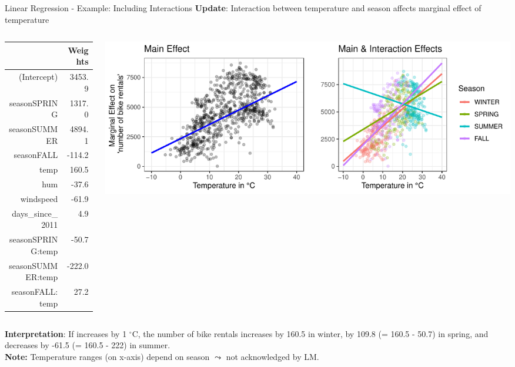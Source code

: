 \documentclass[11pt,compress,t,notes=noshow, aspectratio=169, xcolor=table]{beamer}
\begin{document}
\begin{frame}{Linear Regression - Example: Including Interactions}
\textbf{Update}: Interaction between temperature and season affects marginal effect of temperature%
\begin{columns}[T]
\begin{column}{0.25\textwidth}
\begin{tiny}
\begin{table}[ht]
\centering
\begin{tabular}{rr}
  \hline
 & Weights \\ 
  \hline
(Intercept) & 3453.9 \\ 
  seasonSPRING & 1317.0 \\ 
  seasonSUMMER & 4894.1 \\ 
  seasonFALL & -114.2 \\ 
  temp & 160.5 \\ 
  hum & -37.6 \\ 
  windspeed & -61.9 \\ 
  days\_since\_2011 & 4.9 \\
  \hline
  seasonSPRING:temp & -50.7 \\ 
  seasonSUMMER:temp & -222.0 \\ 
  seasonFALL:temp & 27.2 \\ 
   \hline
\end{tabular}
\end{table}
\end{tiny}
\end{column}
\begin{column}{0.7\textwidth}
\includegraphics[width = \textwidth]{figure/lm_main_vs_interaction_effects.pdf}
\end{column}
\end{columns}
\vfill
\pause
\textbf{Interpretation}: If  increases by 1 $^{\circ}$C, the number of bike rentals increases by 160.5 in winter, by 109.8 (= 160.5 - 50.7) in spring, and decreases by -61.5 (= 160.5 - 222) in summer.\\\vspace*{0.2cm}
\textbf{Note:} Temperature ranges (on x-axis) depend on season $\leadsto$ not acknowledged by LM.
\end{frame}
\end{document}

